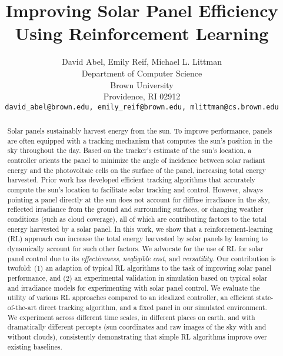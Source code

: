 \documentclass{article}
\title{Improving Solar Panel Efficiency Using Reinforcement Learning}
\author{
David Abel, Emily Reif, Michael L. Littman \\
Department of Computer Science\\
Brown University \\
Providence, RI 02912 \\
\texttt{david\_abel@brown.edu, emily\_reif@brown.edu, mlittman@cs.brown.edu} \\
}
\begin{document}
\maketitle


\begin{abstract}
Solar panels sustainably harvest energy from the sun. To improve performance, panels are often equipped with a tracking mechanism that computes the sun's position in the sky throughout the day. Based on the tracker's estimate of the sun's location, a controller orients the panel to minimize the angle of incidence between solar radiant energy and the photovoltaic cells on the surface of the panel, increasing total energy harvested. Prior work has developed efficient tracking algorithms that accurately compute the sun's location to facilitate solar tracking and control.
%
However, always pointing a panel directly at the sun does not account for diffuse irradiance in the sky, reflected irradiance from the ground and surrounding surfaces, or changing weather conditions (such as cloud coverage), all of which are contributing factors to the total energy harvested by a solar panel.
%
In this work, we show that a reinforcement-learning (RL) approach can increase the total energy harvested by solar panels by learning to dynamically account for such other factors. We advocate for the use of RL for solar panel control due to its {\it effectiveness}, {\it negligible cost}, and {\it versatility}. Our contribution is twofold: (1) an adaption of typical RL algorithms to the task of improving solar panel performance, and (2) an experimental validation in simulation based on typical solar and irradiance models for experimenting with solar panel control.
%
We evaluate the utility of various RL approaches compared to an idealized controller, an efficient state-of-the-art direct tracking algorithm, and a fixed panel in our simulated environment. We experiment across different time scales, in different places on earth, and with dramatically different percepts (sun coordinates and raw images of the sky with and without clouds), consistently demonstrating that simple RL algorithms improve over existing baselines.
\end{abstract}



\newpage
\end{document}
